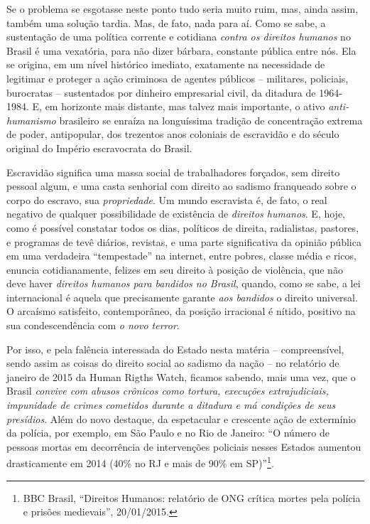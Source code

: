 Se o problema se esgotasse neste ponto tudo seria muito ruim, mas, ainda
assim, também uma solução tardia. Mas, de fato, nada para aí. Como se
sabe, a sustentação de uma política corrente e cotidiana \emph{contra os
direitos humanos} no Brasil é uma vexatória, para não dizer bárbara,
constante pública entre nós. Ela se origina, em um nível histórico
imediato, exatamente na necessidade de legitimar e proteger a ação
criminosa de agentes públicos -- militares, policiais, burocratas --
sustentados por dinheiro empresarial civil, da ditadura de 1964-1984. E,
em horizonte mais distante, mas talvez mais importante, o ativo
\emph{anti-humanismo} brasileiro se enraíza na longuíssima tradição de
concentração extrema de poder, antipopular, dos trezentos anos coloniais
de escravidão e do século original do Império escravocrata do Brasil.

Escravidão significa uma massa social de trabalhadores forçados, sem
direito pessoal algum, e uma casta senhorial com direito ao sadismo
franqueado sobre o corpo do escravo, sua \emph{propriedade}. Um mundo
escravista é, de fato, o real negativo de qualquer possibilidade de
existência de \emph{direitos humanos}. E, hoje, como é possível
constatar todos os dias, políticos de direita, radialistas, pastores, e
programas de tevê diários, revistas, e uma parte significativa da
opinião pública em uma verdadeira ``tempestade'' na internet, entre
pobres, classe média e ricos, enuncia cotidianamente, felizes em seu
direito à posição de violência, que não deve haver \emph{direitos
humanos para bandidos no Brasil}, quando, como se sabe, a lei
internacional é aquela que precisamente garante \emph{aos bandidos} o
direito universal. O arcaísmo satisfeito, contemporâneo, da posição
irracional é nítido, positivo na sua condescendência com \emph{o novo
terror}.

Por isso, e pela falência interessada do Estado nesta matéria --
compreensível, sendo assim as coisas do direito social ao sadismo da
nação -- no relatório de janeiro de 2015 da Human Rigths Watch, ficamos
sabendo, mais uma vez, que o Brasil \emph{convive com abusos crônicos
como tortura, execuções extrajudiciais, impunidade de crimes cometidos
durante a ditadura e má condições de seus presídios}. Além do novo
destaque, da espetacular e crescente ação de extermínio da polícia, por
exemplo, em São Paulo e no Rio de Janeiro: ``O número de pessoas mortas
em decorrência de intervenções policiais nesses Estados aumentou
drasticamente em 2014 (40\% no RJ e mais de 90\% em SP)''\footnote{BBC
  Brasil, ``Direitos Humanos: relatório de ONG crítica mortes pela
  polícia e prisões medievais'', 20/01/2015.}.

